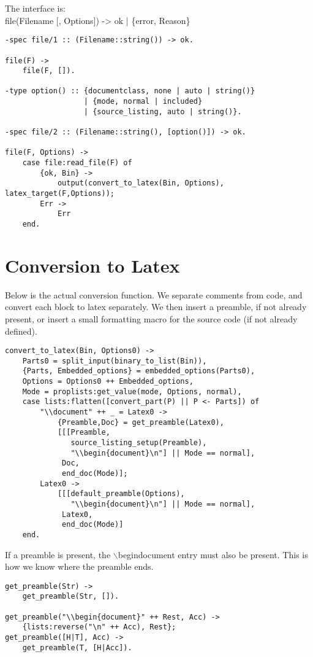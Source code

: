 \documentclass[a4paper,12pt]{article}
\newenvironment{mylisting}
{\begin{list}{}{\setlength{\leftmargin}{1em}}\item\scriptsize\bfseries}
{\end{list}}
\begin{document}
The interface is:\\
file(Filename [, Options]) -> ok | \{error, Reason\}
\begin{mylisting}
\begin{verbatim}
-spec file/1 :: (Filename::string()) -> ok.

file(F) ->
    file(F, []).

-type option() :: {documentclass, none | auto | string()}
                  | {mode, normal | included}
                  | {source_listing, auto | string()}.

-spec file/2 :: (Filename::string(), [option()]) -> ok.

file(F, Options) ->
    case file:read_file(F) of
        {ok, Bin} ->
            output(convert_to_latex(Bin, Options), latex_target(F,Options));
        Err ->
            Err
    end.
\end{verbatim}
\end{mylisting}

\section{Conversion to Latex}
Below is the actual conversion function. We separate comments from code,
and convert each block to latex separately. We then insert a preamble,
if not already present, or insert a small formatting macro for the 
source code (if not already defined).
\begin{mylisting}
\begin{verbatim}
convert_to_latex(Bin, Options0) ->
    Parts0 = split_input(binary_to_list(Bin)),
    {Parts, Embedded_options} = embedded_options(Parts0),
    Options = Options0 ++ Embedded_options,
    Mode = proplists:get_value(mode, Options, normal),
    case lists:flatten([convert_part(P) || P <- Parts]) of
        "\\document" ++ _ = Latex0 ->
            {Preamble,Doc} = get_preamble(Latex0),
            [[[Preamble,
               source_listing_setup(Preamble),
               "\\begin{document}\n"] || Mode == normal],
             Doc,
             end_doc(Mode)];
        Latex0 ->
            [[[default_preamble(Options),
               "\\begin{document}\n"] || Mode == normal],
             Latex0,
             end_doc(Mode)]
    end.
\end{verbatim}
\end{mylisting}

If a preamble is present, the $\backslash$begin{document} entry
must also be present. This is how we know where the preamble ends.
\begin{mylisting}
\begin{verbatim}
get_preamble(Str) ->
    get_preamble(Str, []).

get_preamble("\\begin{document}" ++ Rest, Acc) ->
    {lists:reverse("\n" ++ Acc), Rest};
get_preamble([H|T], Acc) ->
    get_preamble(T, [H|Acc]).
\end{verbatim}
\end{mylisting}
\end{document}
